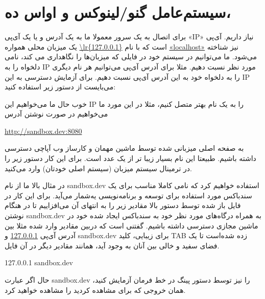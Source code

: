 \section{سیستم‌عامل گنو/لینوکس و اواس ده،}

برای اتصال به یک سرور معمولا ما به یک آدرس و یا یک آی‌پی «IP» نیاز داریم. آی‌پی یک میزبان محلی همواره 
\url{\lr{127.0.0.1}}
 است که با نام 
 \url{«localhost»}
  نیز شناخته می‌شود. ما می‌توانیم در سیستم خود در فایلی که میزبان‌ها را نگاهداری می کند، نامی دلخواه را به IP مورد نظر نسبت دهیم. مثلا برای آدرس  آی‌پی  می‌توانیم هر نام دیگری را به دلخواه خود به این آدرس آی‌پی نسبت دهیم. برای آزمایش دسترسی به این IP می‌بایست از دستور زیر استفاده کنید:
\begin{latin}
    
\end{latin}

خوب حال ما می‌خواهیم این IP را به یک نام بهتر متصل کنیم، مثلا در این مورد ما می‌خواهیم در صورت نوشتن آدرس 
\begin{latin}
    \url{http://sandbox.dev:8080}
\end{latin}
 به صفحه اصلی میزبانی شده توسط ماشین مهمان و کارساز وب آپاچی دسترسی داشته باشیم. طبیعتا این نام بسیار زیبا تر از یک عدد است. برای این کار دستور زیر را در ترمینال سیستم میزبان (سیستم اصلی خودتان) وارد می‌کنید.
\begin{latin}
    
\end{latin}
در مثال بالا ما از نام sandbox.dev استفاده خواهیم کرد که نامی کاملا مناسب برای یک سندباکس مورد استفاده برای توسعه و برنامه‌نویسی یه‌شمار می‌آید. برای این کار در فایل باز شده توسط دستور بالا مقادیر زیر را به انتهای آن می‌افزاییم تا در هنگام نوشتن sandbox.dev به همراه درگاه‌های مورد نظر خود به سندباکس ایجاد شده خود در ماشین مجازی دسترسی داشته باشیم. گفتنی است که دربین مقادیر وارد شده مثلا بین آدرس آی‌پی \url{127.0.0.1} و sandbox.dev برای زیبایی، کلید TAB زده شده‌است تا یک فضای سفید و خالی بین آنان به وجود آید، همانند مقادیر دیگر در آن فایل.
\

\begin{latin}
    127.0.0.1       sandbox.dev
\end{latin}

حال اگر عبارت sandbox.dev را نیز توسط دستور پینگ   در خط فرمان آزمایش کنید، همان خروجی که برای
مشاهده کردید را مشاهده خواهید کرد.
\\

